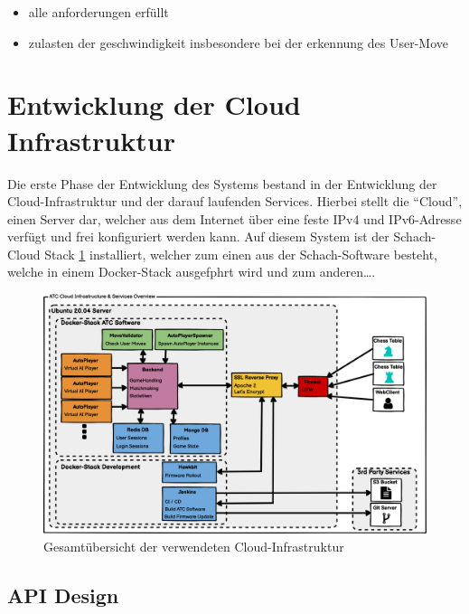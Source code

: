 \begin{itemize}
\tightlist
\item
  alle anforderungen erfüllt
\item
  zulasten der geschwindigkeit insbesondere bei der erkennung des
  User-Move
\end{itemize}

\hypertarget{entwicklung-der-cloud-infrastruktur}{%
\section{Entwicklung der Cloud
Infrastruktur}\label{entwicklung-der-cloud-infrastruktur}}

Die erste Phase der Entwicklung des Systems bestand in der Entwicklung
der Cloud-Infrastruktur und der darauf laufenden Services. Hierbei
stellt die ``Cloud'', einen Server dar, welcher aus dem Internet über
eine feste IPv4 und IPv6-Adresse verfügt und frei konfiguriert werden
kann. Auf diesem System ist der Schach-Cloud Stack
\ref{ATC_Cloud_Architecture} installiert, welcher zum einen aus der
Schach-Software besteht, welche in einem Docker-Stack ausgefphrt wird
und zum anderen\ldots{}.

\begin{figure}
\centering
\includegraphics{images/ATC_Cloud_Architecture.png}
\caption{Gesamtübersicht der verwendeten Cloud-Infrastruktur
\label{ATC_Cloud_Architecture}}
\end{figure}

\hypertarget{api-design}{%
\subsection{API Design}\label{api-design}}

